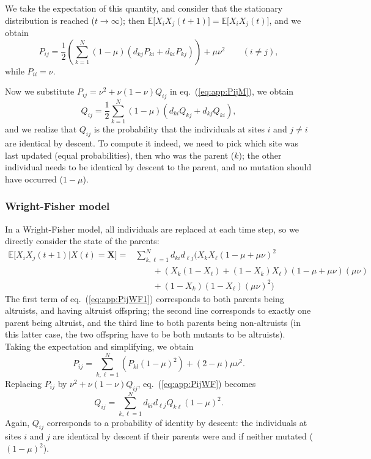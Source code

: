 \documentclass[11pt, letterpaper]{article}
\renewcommand{\eqref}[1]{\textup{{\normalfont eq.~(\ref{#1}}\normalfont)}}
\newcommand{\Esp}[1]{\mathbb{E}\big[ #1\big]}%
\newcommand{\mutbias}{\nu}
\begin{document}
We take the expectation of this quantity, and consider that the stationary distribution is reached ($t\to \infty$); then $\Esp{X_iX_j(t+1)} = \Esp{X_i X_j (t)}$, and we obtain
%
\begin{equation}\label{eq:app:PijM}
P_{ij} = \frac{1}{2} \left(\sum_{k=1}^N (1-\mu) \left( d_{kj} P_{ki} + d_{ki} P_{kj}\right) \right) + \mu \mutbias^2 \qquad (i\neq j ),
\end{equation} 
while $P_{ii}=\mutbias$. 

Now we substitute $P_{ij} = \mutbias^2 + \mutbias (1-\mutbias) Q_{ij}$ in \eqref{eq:app:PijM}, we obtain
\begin{equation}\label{eq:app:QijM}
Q_{ij} = \frac{1}{2} \sum_{k=1}^N (1-\mu) \left( d_{ki} Q_{kj} + d_{kj} Q_{ki}\right),
\end{equation}
and we realize that $Q_{ij}$ is the probability that the individuals at sites $i$ and $j \neq i$ are identical by descent. To compute it indeed, we need to pick which site was last updated (equal probabilities), then who was the parent ($k$); the other individual needs to be identical by descent to the parent, and no mutation should have occurred ($1-\mu$). 

\subsubsection{Wright-Fisher model}

In a Wright-Fisher model, all individuals are replaced at each time step, so we directly consider the state of the parents:
\begin{align}\label{eq:app:PijWF1}
 \Esp{X_iX_j(t+1)|X(t)=\mathbf{X}} = & \sum_{k, \ell = 1}^N  d_{ki} d_{\ell j} \Bigg( X_k X_{\ell} (1-\mu+\mu \mutbias)^2 \nonumber\\ & \qquad + \left( X_k (1-X_{\ell}) + (1-X_k) X_{\ell} \right) (1-\mu+\mu \mutbias) (\mu \mutbias) \nonumber\\
 & \qquad + (1-X_k)(1-X_{\ell}) (\mu \mutbias)^2 \Bigg)
\end{align}
The first term of \eqref{eq:app:PijWF1} corresponds to both parents being altruists, and having altruist offspring; the second line corresponds to exactly one parent being altruist, and the third line to both parents being non-altruists (in this latter case, the two offspring have to be both mutants to be altruists). \\
Taking the expectation and simplifying, we obtain
\begin{equation}\label{eq:app:PijWF}
P_{ij} = \sum_{k, \ell = 1}^N \left( P_{kl} (1-\mu)^2  \right)+ (2-\mu)\mu \mutbias^2. 
\end{equation}
Replacing $P_{ij}$ by $\mutbias^2 + \mutbias (1-\mutbias) Q_{ij}$, \eqref{eq:app:PijWF} becomes
\begin{equation}\label{eq:app:QijWF}
Q_{ij} = \sum_{k, \ell=1}^N d_{ki} d_{\ell j} Q_{k\ell} (1-\mu)^2. 
\end{equation}
Again, $Q_{ij}$ corresponds to a probability of identity by descent: the individuals at sites $i$ and $j$ are identical by descent if their parents were and if neither mutated ($(1-\mu)^2$). 
\end{document}
